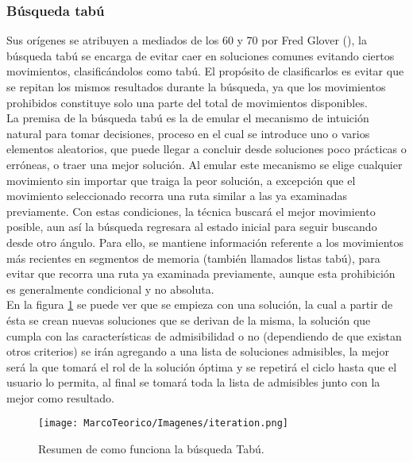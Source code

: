\subsubsection {Búsqueda tabú}
Sus orígenes se atribuyen a mediados de los 60 y 70 por Fred Glover (\cite{ [GLOVER]}), la búsqueda tabú se encarga de evitar caer en soluciones comunes evitando ciertos movimientos, clasificándolos como tabú. El propósito de clasificarlos es evitar que se repitan los mismos resultados durante la búsqueda, ya que los movimientos prohibidos constituye solo una parte del total de movimientos disponibles.\\
\hspace*{1cm}La premisa de la búsqueda tabú es la de emular el mecanismo de intuición natural para tomar decisiones, proceso en el cual se introduce uno o varios elementos aleatorios, que puede llegar a concluir desde soluciones poco prácticas o erróneas, o traer una mejor solución. Al emular este mecanismo se elige cualquier movimiento sin importar que traiga la peor solución, a excepción que el movimiento seleccionado recorra una ruta similar a las ya examinadas previamente. Con estas condiciones, la técnica buscará el mejor movimiento posible, aun así la búsqueda regresara al estado inicial para seguir buscando desde otro ángulo. Para ello, se mantiene información referente a los movimientos más recientes en segmentos de memoria (también llamados listas tabú), para evitar que recorra una ruta ya examinada previamente, aunque esta prohibición es generalmente condicional y no absoluta.\\
\hspace*{1cm}En la figura \ref{fig:iteration} se puede ver que se empieza con una solución, la cual a partir de ésta se crean nuevas soluciones que se derivan de la misma, la solución que cumpla con las características de admisibilidad o no (dependiendo de que existan otros criterios) se irán agregando a una lista de soluciones admisibles, la mejor será la que tomará el rol de la solución óptima y se repetirá el ciclo hasta que el usuario lo permita, al final se tomará toda la lista de admisibles junto con la mejor como resultado.

    \begin{figure}[hbtp]
        \centering
            \texttt{[image: MarcoTeorico/Imagenes/iteration.png]}
            \caption{Resumen de como funciona la búsqueda Tabú.}                       
            \label{fig:iteration}
    \end{figure} 
    
